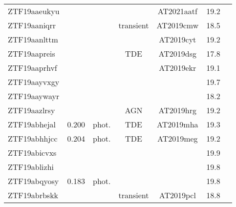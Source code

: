 \begin{table*}
\begin{tabular}{l  c  c  c   c  c  c}
    ZTF19aaeukyu       & ~          & ~             & ~                       & AT2021aatf        & 19.2                       &                \\
    ZTF19aaniqrr       & ~          & ~             & transient               & AT2019cmw         & 18.5                       &                \\
    ZTF19aanlttm       & ~          & ~             & ~                       & AT2019cyt         & 19.2                       &                \\
    ZTF19aapreis       & ~          & ~             & TDE                     & AT2019dsg         & 17.8                       &                \\
    ZTF19aaprhvf       & ~          & ~             & ~                       & AT2019ekr         & 19.1                       &                \\
    ZTF19aayvxgy       & ~          & ~             & ~                       & ~                 & 19.7                       &                \\
    ZTF19aaywayr       & ~          & ~             & ~                       & ~                 & 18.2                       &                \\
    ZTF19aazlrsy       & ~          & ~             & AGN                     & AT2019hrg         & 19.2                       &                \\
    ZTF19abhejal       & 0.200      & phot.         & TDE                     & AT2019mha         & 19.3                       &                \\
    ZTF19abhhjcc       & 0.204      & phot.         & TDE                     & AT2019meg         & 19.2                       &                \\
    ZTF19abicvxs       & ~          & ~             & ~                       & ~                 & 19.9                       &                \\
    ZTF19ablizhi       & ~          & ~             & ~                       & ~                 & 19.8                       &                \\
    ZTF19abqyosy       & 0.183      & phot.         & ~                       & ~                 & 19.8                       &                \\
    ZTF19abrbskk       & ~          & ~             & transient               & AT2019pcl         & 18.8                       &                \\

\end{tabular}
\end{table*}
